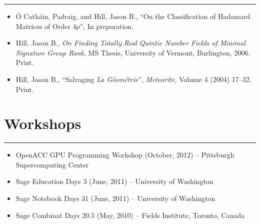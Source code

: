 \documentclass[letterpaper,10pt]{article}
\newcommand{\mblue}{\color{darkblue}}
\begin{document}
\vspace{-2.15pc}
{\hfill\mblue\rule{5.64in}{0.02cm}}

\vspace{1pc}
\begin{itemize}
\item \'O Cath\'ain, Padraig, and Hill, Jason B., ``On the Classification of Hadamard Matrices of Order
$4p$'', In preparation.
\item Hill, Jason B., \textit{On Finding Totally Real Quintic Number Fields of Minimal Signature
Group Rank}, MS Thesis, University of Vermont, Burlington, 2006. Print.
\item Hill, Jason B., ``Salvaging \textit{La G\'eom\'etrie}'', \textit{Meteorite}, Volume 4 (2004)
17--32. Print.
\end{itemize}


\section*{\mblue Workshops}

\vspace{-2.15pc}
{\hfill\mblue\rule{5.76in}{0.02cm}}

\vspace{1pc}
\begin{itemize}
\item OpenACC GPU Programming Workshop (October, 2012) -- Pittsburgh Supercomputing Center
\item Sage Education Days 3 (June, 2011) -- University of Washington
\item Sage Notebook Days 31 (June, 2011) -- University of Washington
\item Sage Combinat Days 20.5 (May, 2010) -- Fields Institute, Toronto, Canada
\end{itemize}
\end{document}
